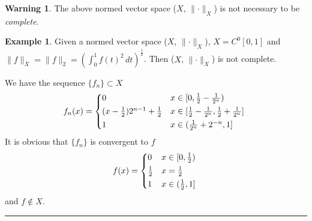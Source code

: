 \documentclass[12pt]{article}
\numberwithin{equation}{section}
\theoremstyle{plain} %
\theoremstyle{definition}
\newtheorem{example}[equation]{Example}
\newtheorem{warning}[equation]{Warning}
\theoremstyle{remark}
\newenvironment{proof}{{\bf Proof:}}{\hfill\rule{2mm}{2mm}}
\begin{document}
\begin{warning}
The above normed vector space ($X$, $\lVert \cdot \rVert_{X}$) is not necessary to be \textit{complete}. 
\end{warning}

\begin{example}
Given a normed vector space ($X$, $\lVert \cdot \rVert_{X}$), $X = C^{0}[0, 1]$ and $\lVert f \rVert_{X} = \lVert f \rVert_{2} = {(\int_{0}^{1} {f(t)}^{2} \, dt)}^{\frac{1}{2}}$. Then ($X$, $\lVert \cdot \rVert_{X}$) is not complete. 
\end{example}

\begin{proof}
We have the sequence $\{f_n\} \subset X$
\begin{equation*}
    f_n(x) = 
    \begin{cases*}
		0  & $x \in [0, \frac{1}{2} - \frac{1}{2^{n}})$ \\
		(x - \frac{1}{2})2^{n-1} + \frac{1}{2}      & $x \in [\frac{1}{2} - \frac{1}{2^{n}}, \frac{1}{2} + \frac{1}{2^{n}}]$ \\
     	1       & $x \in (\frac{1}{2^{n}} + 2^{-n}, 1]$
    \end{cases*}
\end{equation*}
It is obvious that $\{f_n\}$ is convergent to $f$
\begin{equation*}
    f(x) = 
    \begin{cases*}
		0  & $x \in [0, \frac{1}{2})$ \\
		\frac{1}{2}      & $x = \frac{1}{2}$ \\
     	1       & $x \in (\frac{1}{2}, 1]$
    \end{cases*}
\end{equation*}
and $f \notin X$. 
\end{proof}


%  	
%
%

%

\end{document}
